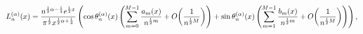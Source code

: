 \[\mathop{L^{(\alpha)}_{n}\/}\nolimits\!\left(x\right)=\frac{n^{\frac{1}{2}%
\alpha-\frac{1}{4}}e^{\frac{1}{2}x}}{\pi^{\frac{1}{2}}x^{\frac{1}{2}\alpha+%
\frac{1}{4}}}\left(\mathop{\cos\/}\nolimits\theta_{n}^{(\alpha)}(x)\left(\sum_%
{m=0}^{M-1}\frac{a_{m}(x)}{n^{\frac{1}{2}m}}+\mathop{O\/}\nolimits\!\left(%
\frac{1}{n^{\frac{1}{2}M}}\right)\right)+\mathop{\sin\/}\nolimits\theta_{n}^{(%
\alpha)}(x)\left(\sum_{m=1}^{M-1}\frac{b_{m}(x)}{n^{\frac{1}{2}m}}+\mathop{O\/%
}\nolimits\!\left(\frac{1}{n^{\frac{1}{2}M}}\right)\right)\right),\]